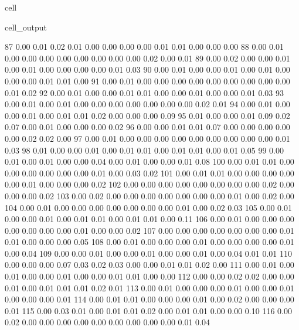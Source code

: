 \documentclass[letterpaper,10pt,english]{jupyterBook}
\begin{document}
\begin{sphinxuseclass}{cell}
\begin{sphinxVerbatimOutput}
\begin{sphinxuseclass}{cell_output}
\begin{sphinxVerbatim}[commandchars=\\\{\}]
        87	0.00 	0.01 	0.02 	0.01 	0.00 	0.00 	0.00 	0.00 	0.01 	0.01 	0.00 	0.00 	0.00
        88	0.00 	0.01 	0.00 	0.00 	0.00 	0.00 	0.00 	0.00 	0.00 	0.00 	0.02 	0.00 	0.01
        89	0.00 	0.02 	0.00 	0.00 	0.01 	0.00 	0.01 	0.00 	0.00 	0.00 	0.00 	0.01 	0.03
        90	0.00 	0.01 	0.00 	0.00 	0.01 	0.00 	0.01 	0.00 	0.00 	0.00 	0.01 	0.01 	0.00
        91	0.00 	0.01 	0.00 	0.00 	0.00 	0.00 	0.00 	0.00 	0.00 	0.00 	0.00 	0.01 	0.02
        92	0.00 	0.01 	0.00 	0.00 	0.01 	0.01 	0.00 	0.00 	0.01 	0.00 	0.00 	0.01 	0.03
        93	0.00 	0.01 	0.00 	0.01 	0.00 	0.00 	0.00 	0.00 	0.00 	0.00 	0.00 	0.02 	0.01
        94	0.00 	0.01 	0.00 	0.00 	0.01 	0.00 	0.01 	0.01 	0.02 	0.00 	0.00 	0.00 	0.09
        95	0.01 	0.00 	0.00 	0.01 	0.09 	0.02 	0.07 	0.00 	0.01 	0.00 	0.00 	0.00 	0.02
        96	0.00 	0.00 	0.01 	0.01 	0.07 	0.00 	0.00 	0.00 	0.00 	0.00 	0.02 	0.02 	0.00
        97	0.00 	0.01 	0.00 	0.00 	0.00 	0.00 	0.00 	0.00 	0.00 	0.00 	0.00 	0.01 	0.03
        98	0.01 	0.00 	0.00 	0.01 	0.00 	0.01 	0.01 	0.00 	0.01 	0.01 	0.00 	0.01 	0.05
        99	0.00 	0.01 	0.00 	0.01 	0.00 	0.00 	0.04 	0.00 	0.01 	0.00 	0.00 	0.01 	0.08
       100	0.00 	0.01 	0.01 	0.00 	0.00 	0.00 	0.00 	0.00 	0.00 	0.01 	0.00 	0.03 	0.02
       101	0.00 	0.01 	0.01 	0.00 	0.00 	0.00 	0.00 	0.00 	0.01 	0.00 	0.00 	0.00 	0.02
       102	0.00 	0.00 	0.00 	0.00 	0.00 	0.00 	0.00 	0.00 	0.02 	0.00 	0.00 	0.00 	0.02
       103	0.00 	0.02 	0.00 	0.00 	0.00 	0.00 	0.00 	0.00 	0.00 	0.01 	0.00 	0.02 	0.00
       104	0.00 	0.01 	0.00 	0.00 	0.00 	0.00 	0.00 	0.00 	0.00 	0.01 	0.00 	0.02 	0.03
       105	0.00 	0.01 	0.00 	0.00 	0.01 	0.00 	0.01 	0.01 	0.00 	0.01 	0.01 	0.00 	0.11
       106	0.00 	0.01 	0.00 	0.00 	0.00 	0.00 	0.00 	0.00 	0.00 	0.01 	0.00 	0.00 	0.02
       107	0.00 	0.00 	0.00 	0.00 	0.00 	0.00 	0.00 	0.01 	0.01 	0.00 	0.00 	0.00 	0.05
       108	0.00 	0.01 	0.00 	0.00 	0.00 	0.01 	0.00 	0.00 	0.00 	0.00 	0.01 	0.00 	0.04
       109	0.00 	0.00 	0.01 	0.00 	0.00 	0.01 	0.00 	0.00 	0.01 	0.00 	0.04 	0.01 	0.01
       110	0.00 	0.00 	0.00 	0.07 	0.03 	0.02 	0.03 	0.00 	0.00 	0.01 	0.01 	0.02 	0.00
       111	0.00 	0.01 	0.00 	0.01 	0.00 	0.00 	0.01 	0.00 	0.00 	0.01 	0.01 	0.00 	0.00
       112	0.00 	0.00 	0.02 	0.02 	0.00 	0.00 	0.01 	0.00 	0.01 	0.01 	0.01 	0.02 	0.01
       113	0.00 	0.01 	0.00 	0.00 	0.00 	0.01 	0.00 	0.00 	0.01 	0.00 	0.00 	0.00 	0.01
       114	0.00 	0.01 	0.01 	0.00 	0.00 	0.00 	0.01 	0.00 	0.02 	0.00 	0.00 	0.00 	0.01
       115	0.00 	0.03 	0.01 	0.00 	0.01 	0.01 	0.02 	0.00 	0.01 	0.01 	0.00 	0.00 	0.10
       116	0.00 	0.02 	0.00 	0.00 	0.00 	0.00 	0.00 	0.00 	0.00 	0.00 	0.00 	0.01 	0.04

\end{sphinxVerbatim}
\end{sphinxuseclass}
\end{sphinxVerbatimOutput}
\end{sphinxuseclass}
\end{document}
